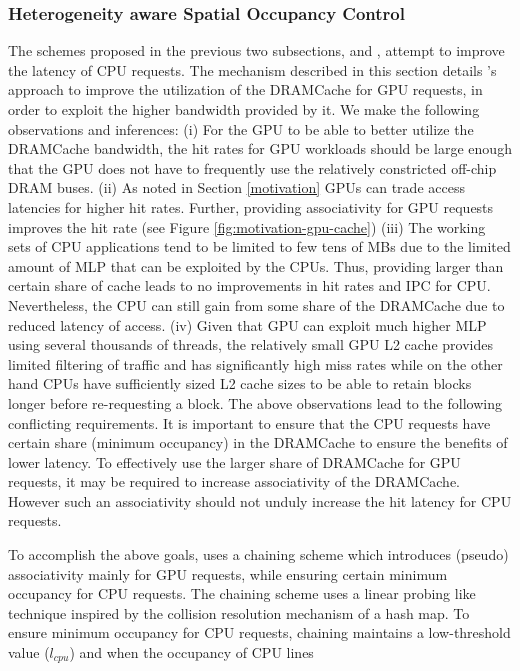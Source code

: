 \subsubsection{Heterogeneity aware Spatial Occupancy Control}
The schemes proposed in the previous two subsections, \prioname and \bypassname, attempt to improve the latency of CPU requests. The mechanism described in this section details \cachename's approach to improve the utilization of the DRAMCache for GPU requests, in order to exploit the higher bandwidth provided by it. We make the following observations and inferences: (i) For the GPU to be able to better utilize the DRAMCache bandwidth, the hit rates for GPU workloads should be large enough that the GPU does not have to frequently use the relatively constricted off-chip DRAM buses. (ii) As noted in Section \ref{motivation} GPUs can trade access latencies for higher hit rates. Further, providing associativity for GPU requests improves the hit rate (see Figure \ref{fig:motivation-gpu-cache}) (iii) The working sets of CPU applications tend to be limited to few tens of MBs due to the limited amount of MLP that can be exploited by the CPUs. Thus, providing larger than certain share of cache leads to no improvements in hit rates and IPC for CPU. Nevertheless, the CPU can still gain from some share of the DRAMCache due to reduced latency of access. (iv) Given that GPU can exploit much higher MLP using several thousands of threads, the relatively small GPU L2 cache provides limited filtering of traffic and has significantly high miss rates while on the other hand CPUs have sufficiently sized L2 cache sizes to be able to retain blocks longer before re-requesting a block.
The above observations lead to the following conflicting requirements. It is important to ensure that the CPU requests have certain share (minimum occupancy) in the DRAMCache to ensure the benefits of lower latency. To effectively use the larger share of DRAMCache for GPU requests, it may be required to increase  associativity of the DRAMCache. However such an associativity should not unduly increase the hit latency for CPU requests. 
\par To accomplish the above goals, \cachename uses a chaining scheme which introduces (pseudo) associativity mainly for GPU requests, while ensuring certain minimum occupancy for CPU requests. The chaining scheme uses a linear probing like technique inspired by the collision resolution mechanism of a hash map. 
To ensure minimum occupancy for CPU requests, chaining maintains a low-threshold value (\textit{$l_{cpu}$}) and when the occupancy of CPU lines
